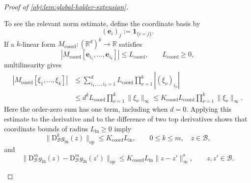 \begin{proof}[Proof of \cref{obj:lem:global-holder-extension}]
\begin{enumerate}
To see the relevant norm estimate, define the coordinate basis by
\[
(\mathbf e_i)_j:=\mathbf 1_{\{i=j\}}.
\]
If a \(k\)-linear form \(M_{\mathrm{coord}}:(\mathbb R^d)^k\to\mathbb R\) satisfies
\[
|M_{\mathrm{coord}}[\mathbf e_{i_1},\ldots,\mathbf e_{i_k}]|
\le L_{\mathrm{coord}},
\qquad L_{\mathrm{coord}}\ge0,
\]
multilinearity gives
\[
\begin{aligned}
|M_{\mathrm{coord}}[\xi_1,\ldots,\xi_k]|
&\le
\sum_{i_1,\ldots,i_k=1}^d
L_{\mathrm{coord}}\prod_{\nu=1}^k|(\xi_\nu)_{i_\nu}|\\
&\le d^kL_{\mathrm{coord}}
\prod_{\nu=1}^k\|\xi_\nu\|_\infty
\le K_{\mathrm{coord}}L_{\mathrm{coord}}
\prod_{\nu=1}^k\|\xi_\nu\|_\infty.
\end{aligned}
\]
Here the order-zero sum has one term, including when \(d=0\). Applying this estimate to the derivative and to the difference of two top derivatives shows that coordinate bounds of radius \(L_{\mathrm{in}}\ge0\) imply
\[
\|\mathrm D_{\mathcal B}^{k}g_{\mathrm{in}}(z)\|_{\mathrm{op}}
\le K_{\mathrm{coord}}L_{\mathrm{in}},
\qquad 0\le k\le m,\quad z\in\mathcal B,
\]
and
\[
\|\mathrm D_{\mathcal B}^{m}g_{\mathrm{in}}(z)
-\mathrm D_{\mathcal B}^{m}g_{\mathrm{in}}(z')\|_{\mathrm{op}}
\le K_{\mathrm{coord}}L_{\mathrm{in}}\|z-z'\|_\infty^s,
\qquad z,z'\in\mathcal B.
\]


\end{enumerate}
\end{proof}

